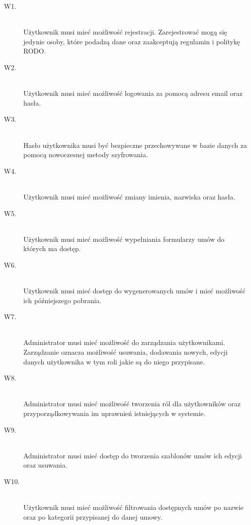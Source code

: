 \begin{description}
    \item[W1.] \hfill \\
    Użytkownik musi mieć możliwość rejestracji. Zarejestrować mogą się jedynie osoby, które podadzą dane oraz zaakceptują regulamin i politykę RODO. 

    \item[W2.] \hfill \\
    Użytkownik musi mieć możliwość logowania za pomocą adresu email oraz hasła. 

    \item[W3.] \hfill \\
    Hasło użytkownika musi być bezpieczne przechowywane w bazie danych za pomocą nowoczesnej metody szyfrowania. 

    \item[W4.] \hfill \\
    Użytkownik musi mieć możliwość zmiany imienia, nazwiska oraz hasła. 

    \item[W5.] \hfill \\
    Użytkownik musi mieć możliwość wypełniania formularzy umów do których ma dostęp. 

    \item[W6.] \hfill \\
    Użytkownik musi mieć dostęp do wygenerowanych umów i mieć możliwość ich późniejszego pobrania. 

    \item[W7.] \hfill \\
    Administrator musi mieć możliwość do zarządzania użytkownikami. Zarządzanie oznacza możliwość usuwania, dodawania nowych, edycji danych użytkownika w tym roli jakie są do niego przypisane. 

    \item[W8.] \hfill \\
    Administrator musi mieć możliwość tworzenia ról dla użytkowników oraz przyporządkowywania im uprawnień istniejących w systemie. 

    \item[W9.] \hfill \\
    Administrator musi mieć dostęp do tworzenia szablonów umów ich edycji oraz usuwania. 

    \item[W10.] \hfill \\
    Użytkownik musi mieć możliwość filtrowania dostępnych umów po nazwie oraz po kategorii przypisanej do danej umowy. 
\end{description}